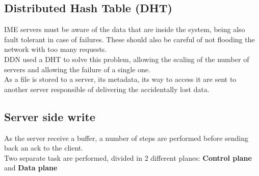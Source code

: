 
\subsection{Distributed Hash Table (DHT)}
IME servers must be aware of the data that are inside the system, being also
fault tolerant in case of failures. These should also be careful of not flooding
the network with too many requests. \\
DDN used a DHT to solve this problem, allowing the scaling of the number of
servers and allowing the failure of a single one. \\
As a file is stored to a server, its metadata, its way to access it are sent to
another server responsible of delivering the accidentally lost data.

\subsection{Server side write}
As the server receive a buffer, a number of steps are performed before sending
back an ack to the client. \\ Two separate task are performed, divided in 2
different planes: \textbf{Control plane} and \textbf{Data plane}


